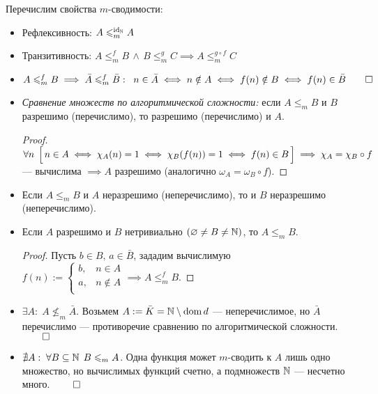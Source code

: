 \documentclass[a4paper, fleqn]{article}
\DeclareMathOperator{\dom}{\mathop{\mathrm{dom}}}
\newcommand{\wo}{\setminus} %
\newcommand{\void}{\varnothing} %
\newcommand{\mred}{\leqslant_m} %
\begin{document}
        Перечислим свойства $m$-сводимости:

        \begin{itemize}
            \item Рефлексивность: $A \mred^{\text{id}_{\NN}} A$

            \item Транзитивность: $A \mred^f B \,\wedge\, B \mred^g C \implies A \mred^{g \circ f} C$

            \item $A \mred^f B \implies \bar A \mred^f \bar B: \;\; n \in \bar A \iff n \notin A \iff f(n) \notin B \iff f(n) \in \bar B \qed$

            \item \textit{Сравнение множеств по алгоритмической сложности:} если $A \mred B$ и $B$ разрешимо (перечислимо), то разрешимо (перечислимо) и $A$.

            \begin{proof}
                $\forall n \;\, \Bigl[\, n \in A \iff \chi_A(n) = 1 \iff \chi_B(f(n)) = 1 \iff f(n) \in B \,\Bigr] \implies \chi_A = \chi_B \circ f$ --- вычислима $\implies A$ разрешимо (аналогично $\omega_A = \omega_B \circ f$).
            \end{proof}

            \item \begin{corollary}
                Если $A \mred B$ и $A$ неразрешимо (неперечислимо), то и $B$ неразрешимо (неперечислимо).
            \end{corollary}

            \item Если $A$ разрешимо и $B$ нетривиально $(\void \ne B \ne \NN)$, то $A \mred B$.

            \begin{proof}
            Пусть $b \in B, \, a \in \bar B$, зададим вычислимую $f(n) :=
            \begin{cases}
            b, & n \in A \\
            a, & n \notin A \\
            \end{cases} \implies A \mred^f B$.
            \end{proof}

            \item $\exists A : \; A \not \mred \bar A$. Возьмем $A := \bar K = \NN \wo \dom d$ --- неперечислимое, но $\bar A$ перечислимо --- противоречие сравнению по алгоритмической сложности. $\qed$

            \item $\nexists A : \; \forall B \subseteq \NN \;\, B \mred A$. Одна функция может $m$-сводить к $A$ лишь одно множество, но вычислимых функций счетно, а подмножеств $\mathbb{N}$ --- несчетно много. $\qed$
        \end{itemize}
\end{document}
